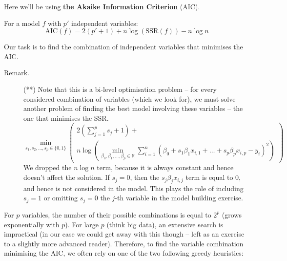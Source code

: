 \documentclass[10pt,b5paper,krantz1]{krantz}
\begin{document}
Here we'll be using \textbf{the Akaike Information Criterion} (AIC).

For a model \(f\) with \(p'\) independent variables:
\[
\mathrm{AIC}(f) = 2(p'+1)+n\log(\mathrm{SSR}(f))-n\log n
\]

Our task is to find the combination of independent variables
that minimises the AIC.

\begin{description}
\item[Remark.]
(**) Note that this is a bi-level optimisation problem -- for every
considered combination of variables (which we look for),
we must solve another problem of finding the best model
involving these variables -- the one that minimises the SSR.
\[
\min_{s_1,s_2,\dots,s_p\in\{0, 1\}}
\left(
\begin{array}{l}
2\left(\displaystyle\sum_{j=1}^p s_j +1\right)+\\
n\log\left(
\displaystyle\min_{\beta_0,\beta_1,\dots,\beta_p\in\mathbb{R}}
\sum_{i=1}^n \left(
\beta_0 + s_1\beta_1 x_{i,1} + \dots + s_p\beta_p x_{i,p}
-y_i
\right)^2
\right)
\end{array}
\right)
\]
We dropped the \(n\log n\) term, because it is always constant
and hence doesn't affect the solution.
If \(s_j=0\), then the \(s_j\beta_j x_{i,j}\) term is equal to
\(0\), and hence is not considered in the model.
This plays the role of including \(s_j=1\) or omitting \(s_j=0\) the \(j\)-th
variable in the model building exercise.
\end{description}

For \(p\) variables, the number of their possible
combinations is equal to \(2^p\)
(grows exponentially with \(p\)).
For large \(p\) (think big data), an extensive search is impractical
(in our case we could get away with this though -- left as an exercise
to a slightly more advanced reader).
Therefore, to find the variable combination minimising the AIC,
we often rely on one of the two following greedy heuristics:
\end{document}

